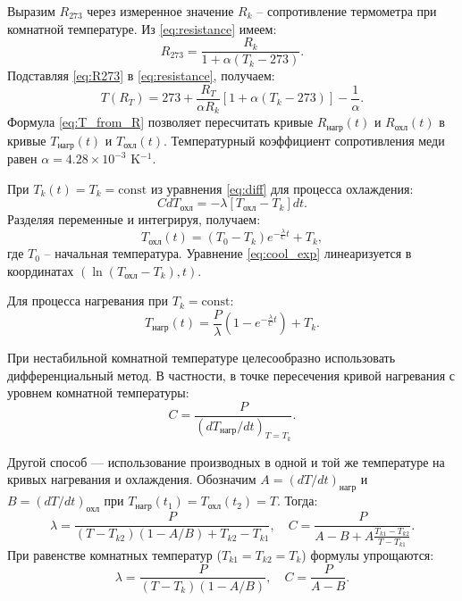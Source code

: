 \documentclass[a4paper,12pt]{article}
\begin{document}
Выразим $R_{273}$ через измеренное значение $R_k$ – сопротивление термометра при комнатной температуре. Из \eqref{eq:resistance} имеем:
\begin{equation}
    R_{273} = \frac{R_k}{1 + \alpha(T_k - 273)}.
    \label{eq:R273}
\end{equation}
Подставляя \eqref{eq:R273} в \eqref{eq:resistance}, получаем:
\begin{equation}
    T(R_T) = 273 + \frac{R_T}{\alpha R_k} [1 + \alpha(T_k - 273)] - \frac{1}{\alpha}.
    \label{eq:T_from_R}
\end{equation}
Формула \eqref{eq:T_from_R} позволяет пересчитать кривые $R_{\text{нагр}}(t)$ и $R_{\text{охл}}(t)$ в кривые $T_{\text{нагр}}(t)$ и $T_{\text{охл}}(t)$. Температурный коэффициент сопротивления меди равен $\alpha = 4.28 \times 10^{-3}$ K$^{-1}$.

При $T_k(t) = T_k = \text{const}$ из уравнения \eqref{eq:diff} для процесса охлаждения:
\begin{equation}
    C dT_{\text{охл}} = -\lambda[T_{\text{охл}} - T_k] dt.
    \label{eq:cool_diff}
\end{equation}
Разделяя переменные и интегрируя, получаем:
\begin{equation}
    T_{\text{охл}}(t) = (T_0 - T_k) e^{-\frac{\lambda}{C} t} + T_k,
    \label{eq:cool_exp}
\end{equation}
где $T_0$ – начальная температура. Уравнение \eqref{eq:cool_exp} линеаризуется в координатах $(\ln(T_{\text{охл}} - T_k), t)$.

Для процесса нагревания при $T_k = \text{const}$:
\begin{equation}
    T_{\text{нагр}}(t) = \frac{P}{\lambda} \left(1 - e^{-\frac{\lambda}{C} t}\right) + T_k.
    \label{eq:heat_exp}
\end{equation}

При нестабильной комнатной температуре целесообразно использовать дифференциальный метод. В частности, в точке пересечения кривой нагревания с уровнем комнатной температуры:
\begin{equation}
    C = \frac{P}{(dT_{\text{нагр}}/dt)_{T=T_k}}.
    \label{eq:diff_C}
\end{equation}

Другой способ — использование производных в одной и той же температуре на кривых нагревания и охлаждения. Обозначим $A = (dT/dt)_{\text{нагр}}$ и $B = (dT/dt)_{\text{охл}}$ при $T_{\text{нагр}}(t_1) = T_{\text{охл}}(t_2) = T$. Тогда:
\begin{equation}
    \lambda = \frac{P}{(T - T_{k2})(1 - A/B) + T_{k2} - T_{k1}}, \quad
    C = \frac{P}{A - B + A \frac{T_{k1} - T_{k2}}{T - T_{k1}}}.
    \label{eq:diff_lambda_C}
\end{equation}
При равенстве комнатных температур ($T_{k1} = T_{k2} = T_k$) формулы упрощаются:
\begin{equation}
    \lambda = \frac{P}{(T - T_k)(1 - A/B)}, \quad
    C = \frac{P}{A - B}.
    \label{eq:diff_simple}
\end{equation}
\end{document}
